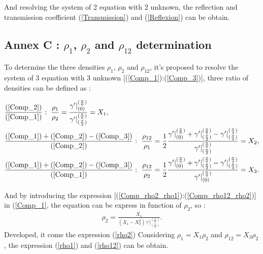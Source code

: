 \documentclass{article}
\begin{document}
    And resolving the system of 2 equation with 2 unknown, the reflection and transmission coefficient (\ref{Transmission}) and (\ref{Reflexion}) can be obtain.
    
\subsection*{Annex C : $\rho_1$, $\rho_2$ and $\rho_{12}$ determination}
\label{Ann_C}	
    To determine the three densities $\rho_1$, $\rho_2$ and $\rho_{12}$, it's proposed to resolve the system of 3 equation with 3 unknown  [(\ref{Comp_1}):(\ref{Comp_3})], three ratio of densities can be defined as : 
    
    \begin{align}
    &\frac{(\ref{Comp_2})}{(\ref{Comp_1})} :\ \frac{\rho_1}{\rho_2}=\frac{\gamma'|^{(\frac{\pi}{6})}_{(0)}}{\gamma'|^{(\frac{\pi}{6})}_{(\frac{\pi}{2})}}=X_1,\label{Comp_rho2_rho1} \\
    &\frac{(\ref{Comp_1})+(\ref{Comp_2})-(\ref{Comp_3})}{(\ref{Comp_2})} :\ \frac{\rho_{12}}{\rho_1}=\frac{1}{2}\frac{\gamma'|^{(\frac{\pi}{6})}_{(0)}+\gamma'|^{(\frac{\pi}{6})}_{(\frac{\pi}{2})}-\gamma'|^{(\frac{\pi}{4})}_{(\frac{\pi}{4})}}{\gamma'|^{(\frac{\pi}{6})}_{(\frac{\pi}{2})}}=X_2,\label{Comp_rho12_rho1} \\
    &\frac{(\ref{Comp_1})+(\ref{Comp_2})-(\ref{Comp_3})}{(\ref{Comp_1})} :\ \frac{\rho_{12}}{\rho_2}=\frac{1}{2}\frac{\gamma'|^{(\frac{\pi}{6})}_{(0)}+\gamma'|^{(\frac{\pi}{6})}_{(\frac{\pi}{2})}-\gamma'|^{(\frac{\pi}{4})}_{(\frac{\pi}{4})}}{\gamma'|^{(\frac{\pi}{6})}_{(0)}}=X_3.\label{Comp_rho12_rho2}
    \end{align}
    
    And by introducing the expression [(\ref{Comp_rho2_rho1}):(\ref{Comp_rho12_rho2})] in (\ref{Comp_1}, the equation can be express in function of $\rho_2$, so :
    \begin{align}
    \rho_2=\frac{X_1}{(X_1-X_3^2)\gamma'|^{(\frac{\pi}{6})}_{(\frac{\pi}{2})}}.\label{comp_rho2}
    \end{align}
    Developed, it come the expression (\ref{rho2})
    Considering $\rho_1=X_1\rho_2$ and $\rho_{12}=X_3\rho_2$, the expression (\ref{rho1}) and (\ref{rho12}) can be obtain.
    
\end{document}
